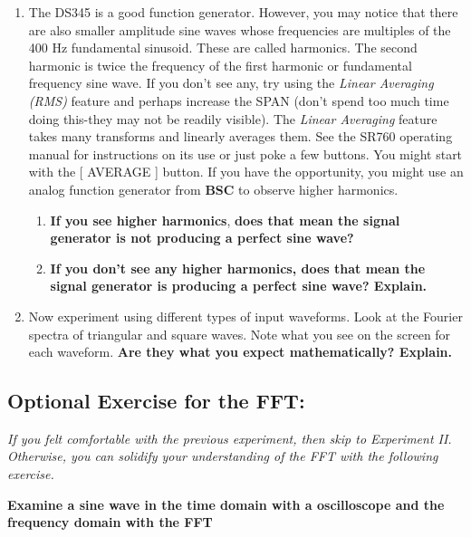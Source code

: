 \documentclass{../lab}
\begin{document}
\begin{enumerate}
    \item The DS345 is a good function generator. However, you may notice that there are also smaller amplitude sine waves whose frequencies are multiples of the 400 Hz fundamental sinusoid. These are called harmonics. The second harmonic is twice the frequency of the first harmonic or fundamental frequency sine wave. If you don't see any, try using the \emph{Linear Averaging (RMS)} feature and perhaps increase the SPAN (don't spend too much time doing this-they may not be readily visible). The \emph{Linear Averaging} feature takes many transforms and linearly averages them. See the SR760 operating manual for instructions on its use or just poke a few buttons. You might start with the [ AVERAGE ] button. If you have the opportunity, you might use an analog function generator from \textbf{BSC} to observe higher harmonics.
    \begin{enumerate}
        \item \textbf{If you see higher harmonics}, \textbf{does that mean the signal generator is not producing a perfect sine wave?}

        \item \textbf{If you don't see any higher harmonics, does that mean the signal generator is producing a perfect sine wave? Explain.}

    \end{enumerate}

    \item Now experiment using different types of input waveforms. Look at the Fourier spectra of triangular and square waves. Note what you see on the screen for each waveform. \textbf{Are they what you expect mathematically? Explain.}

\end{enumerate}

\subsection{Optional Exercise for the FFT:}

\emph{If you felt comfortable with the previous experiment, then skip to Experiment II. Otherwise, you can solidify your understanding of the FFT with the following exercise.}

\noindent\textbf{Examine a sine wave in the time domain with a oscilloscope and the frequency domain with the FFT}
\end{document}
